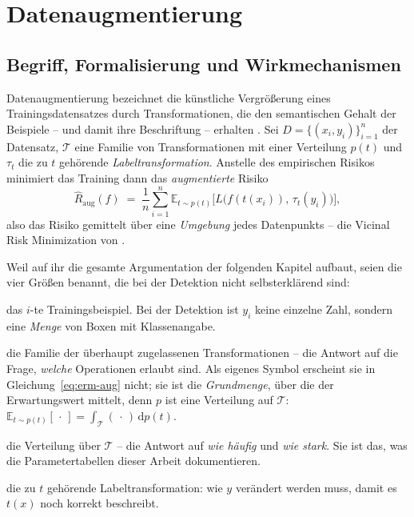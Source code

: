 \chapter{Datenaugmentierung}
\label{kap:augtheorie}

\section{Begriff, Formalisierung und Wirkmechanismen}
\label{sec:augformal}

Datenaugmentierung bezeichnet die künstliche Vergrößerung eines
Trainingsdatensatzes durch Transformationen, die den semantischen Gehalt der
Beispiele -- und damit ihre Beschriftung -- erhalten \parencite{shorten2019}. Sei
$D = \{(x_i, y_i)\}_{i=1}^{n}$ der Datensatz, $\mathcal{T}$ eine Familie von
Transformationen mit einer Verteilung $p(t)$ und $\tau_t$ die zu $t$ gehörende
\emph{Labeltransformation}. Anstelle des empirischen Risikos minimiert das
Training dann das \emph{augmentierte} Risiko
\begin{equation}
\hat{R}_{\text{aug}}(f) \;=\; \frac{1}{n}\sum_{i=1}^{n}
\mathbb{E}_{t \sim p(t)}\Big[ L\big(f(t(x_i)),\, \tau_t(y_i)\big) \Big],
\label{eq:erm-aug}
\end{equation}
also das Risiko gemittelt über eine \emph{Umgebung} jedes Datenpunkts --
die Vicinal Risk Minimization von \textcite{chapelle2001}.

 Weil auf ihr die gesamte Argumentation der
folgenden Kapitel aufbaut, seien die vier Größen benannt, die bei der
Detektion nicht selbsterklärend sind:

\begin{description}[leftmargin=4.2em,style=sameline,itemsep=0pt,
                    font=\normalfont]
  \item[$(x_i, y_i)$] das $i$-te Trainingsbeispiel. Bei der Detektion ist $y_i$
  keine einzelne Zahl, sondern eine \emph{Menge} von Boxen mit Klassenangabe.
  \item[$\mathcal{T}$] die Familie der überhaupt zugelassenen Transformationen --
  die Antwort auf die Frage, \emph{welche} Operationen erlaubt sind. Als eigenes
  Symbol erscheint sie in Gleichung~\eqref{eq:erm-aug} nicht; sie ist die
  \emph{Grundmenge}, über die der Erwartungswert mittelt, denn $p$ ist eine
  Verteilung auf $\mathcal{T}$:
  $\mathbb{E}_{t \sim p(t)}[\,\cdot\,] = \int_{\mathcal{T}}
  (\,\cdot\,)\,\mathrm{d}p(t)$.
  \item[$p(t)$] die Verteilung über $\mathcal{T}$ -- die Antwort auf
  \emph{wie häufig} und \emph{wie stark}. Sie ist das, was die
  Parametertabellen dieser Arbeit dokumentieren.
  \item[$\tau_t$] die zu $t$ gehörende Labeltransformation: wie $y$ verändert
  werden muss, damit es $t(x)$ noch korrekt beschreibt.
\end{description}

